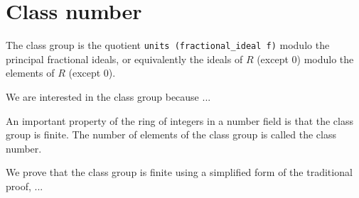 \documentclass{lipics-v2021}
\newcommand{\lean}[1]{\texttt{#1}\xspace} %
\begin{document}
\section{Class number}

The class group is the quotient \lean{units (fractional\_ideal f)} modulo the principal fractional ideals, or equivalently the ideals of $R$ (except $0$) modulo the elements of $R$ (except $0$).

We are interested in the class group because ...

An important property of the ring of integers in a number field is that the class group is finite. The number of elements of the class group is called the class number.

We prove that the class group is finite using a simplified form of the traditional proof, ...
\end{document}
